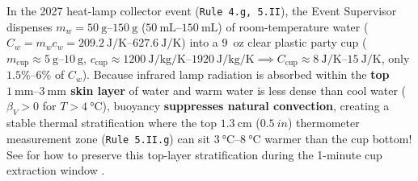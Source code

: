\begin{devicebox}
In the 2027 heat-lamp collector event (\texttt{Rule 4.g, 5.II}), the Event Supervisor dispenses $m_w = \SIrange{50}{150}{\gram}$ ($\SIrange{50}{150}{\milli\liter}$) of room-temperature water ($C_w = m_w c_w = \SIrange{209.2}{627.6}{\joule\per\kelvin}$) into a 9~oz clear plastic party cup ($m_{\mathrm{cup}} \approx \SIrange{5}{10}{\gram}$, $c_{\mathrm{cup}} \approx \SIrange{1200}{1920}{\joule\per\kilogram\per\kelvin} \implies C_{\mathrm{cup}} \approx \SIrange{8}{15}{\joule\per\kelvin}$, only $1.5\%\text{--}6\%$ of $C_w$). Because infrared lamp radiation is absorbed within the \textbf{top $\SIrange{1}{3}{\milli\meter}$ skin layer} of water and warm water is less dense than cool water ($\beta_V > 0$ for $T > \SI{4}{\celsius}$), buoyancy \textbf{suppresses natural convection}, creating a stable thermal stratification where the top $\SI{1.3}{\centi\meter}$ ($\SI{0.5}{in}$) thermometer measurement zone (\texttt{Rule 5.II.g}) can sit $\SIrange{3}{8}{\celsius}$ warmer than the cup bottom! See  for how to preserve this top-layer stratification during the 1-minute cup extraction window .
\end{devicebox}

